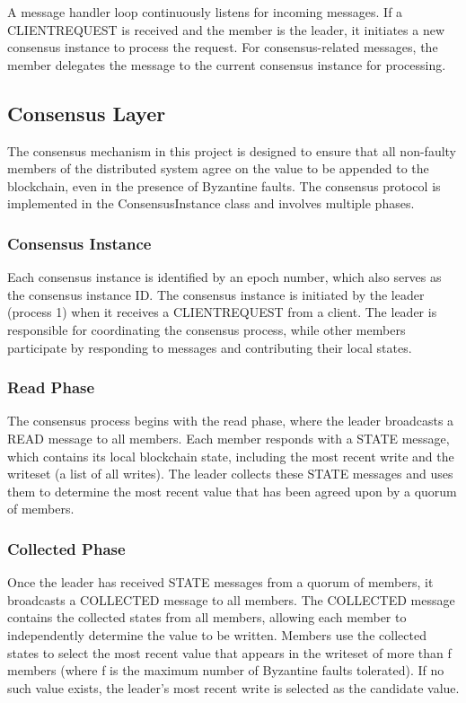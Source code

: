 \documentclass[runningheads]{llncs}
\begin{document}
A message handler loop continuously listens for incoming messages. If a
CLIENTREQUEST is received and the member is the leader, it initiates a new
consensus instance to process the request. For consensus-related messages, the
member delegates the message to the current consensus instance for processing.

%
\subsection{Consensus Layer}
The consensus mechanism in this project is designed to ensure that all
non-faulty members of the distributed system agree on the value to be appended
to the blockchain, even in the presence of Byzantine faults. The consensus
protocol is implemented in the ConsensusInstance class and involves multiple
phases.
\subsubsection{Consensus Instance}
Each consensus instance is identified by an epoch number, which also serves as
the consensus instance ID. The consensus instance is initiated by the leader
(process 1) when it receives a CLIENTREQUEST from a client. The leader is
responsible for coordinating the consensus process, while other members
participate by responding to messages and contributing their local states.
\subsubsection{Read Phase}
The consensus process begins with the read phase, where the leader broadcasts a
READ message to all members. Each member responds with a STATE message, which
contains its local blockchain state, including the most recent write and the
writeset (a list of all writes). The leader collects these STATE messages and
uses them to determine the most recent value that has been agreed upon by a
quorum of members.
\subsubsection{Collected Phase}
Once the leader has received STATE messages from a quorum of members, it
broadcasts a COLLECTED message to all members. The COLLECTED message contains
the collected states from all members, allowing each member to independently
determine the value to be written. Members use the collected states to select
the most recent value that appears in the writeset of more than f members (where
f is the maximum number of Byzantine faults tolerated). If no such value exists,
the leader's most recent write is selected as the candidate value.
\end{document}
